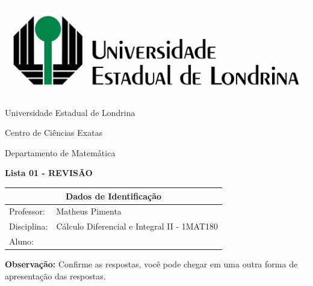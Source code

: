 \documentclass[oneside,a4paper,12pt]{article}
\newcommand{\universidade}{Universidade Estadual de Londrina}
\newcommand{\centro}{Centro de Ciências Exatas}
\newcommand{\departamento}{Departamento de Matemática}
\newcommand{\curso}{Ciência da Computação}
\newcommand{\professores}{Matheus Pimenta}
\newcommand{\disciplina}{Cálculo Diferencial e Integral II - 1MAT180}
\begin{document}
	\pagestyle{empty}
	
	\begin{center}
		\includegraphics[width=\linewidth/2]{logo.jpg}%
	 	\vspace{2pt} 	
		
		\universidade
		\par
		\centro
		\par
		\departamento
		\par
		\par
		\vspace{12pt}
		\LARGE \textbf{Lista 01 - REVISÃO}
		
	\end{center}
	
	\vspace{12pt}
	
	\begin{tabular}{ |l|p{12cm}| }
		
		\hline
		\multicolumn{2}{|c|}{\textbf{Dados de Identificação}} \\
		\hline
		Professor:         &    \professores           \\
		\hline
		Disciplina:        &    \disciplina          \\
		\hline
		Aluno:             &                   \\
		\hline
		
	\end{tabular}
	\vspace{6pt}
	
	{\bf Observação:} Confirme as respostas, você pode chegar em uma outra forma de apresentação das respostas.
	
	\begin{snugshade}
	\end{snugshade}
\end{document}

